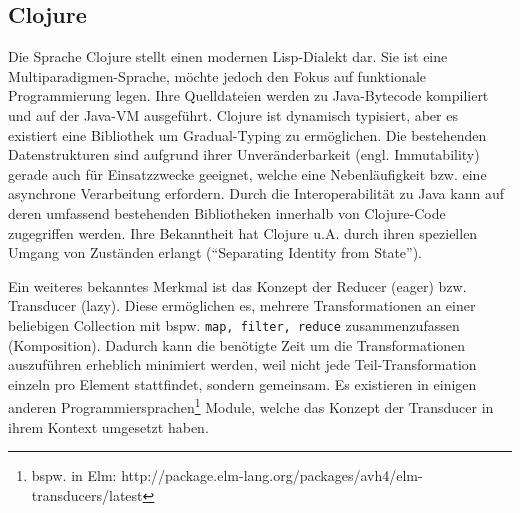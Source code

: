 \subsection{Clojure}
Die Sprache Clojure stellt einen modernen Lisp-Dialekt dar.
Sie ist eine Multiparadigmen-Sprache, möchte jedoch den Fokus auf funktionale Programmierung legen.
Ihre Quelldateien werden zu Java-Bytecode kompiliert und auf der Java-VM ausgeführt.
Clojure ist dynamisch typisiert, aber es existiert eine Bibliothek um Gradual-Typing zu ermöglichen.
Die bestehenden Datenstrukturen sind aufgrund ihrer Unveränderbarkeit (engl. Immutability) gerade auch für Einsatzzwecke geeignet, welche eine Nebenläufigkeit bzw. eine asynchrone Verarbeitung erfordern.
Durch die Interoperabilität zu Java kann auf deren umfassend bestehenden Bibliotheken innerhalb von Clojure-Code zugegriffen werden.
Ihre Bekanntheit hat Clojure \ac{u.A.} durch ihren speziellen Umgang von Zuständen erlangt ("`Separating Identity from State"').
\par
Ein weiteres bekanntes Merkmal ist das Konzept der Reducer (eager) bzw. Transducer (lazy).
Diese ermöglichen es, mehrere Transformationen an einer beliebigen Collection mit \ac{bspw.} \texttt{map, filter, reduce} zusammenzufassen (Komposition).
Dadurch kann die benötigte Zeit um die Transformationen auszuführen erheblich minimiert werden, weil nicht jede Teil-Transformation einzeln pro Element stattfindet, sondern gemeinsam.
Es existieren in einigen anderen Programmiersprachen\footnote{\ac{bspw.} in Elm: http://package.elm-lang.org/packages/avh4/elm-transducers/latest} Module, welche das Konzept der Transducer in ihrem Kontext umgesetzt haben.

